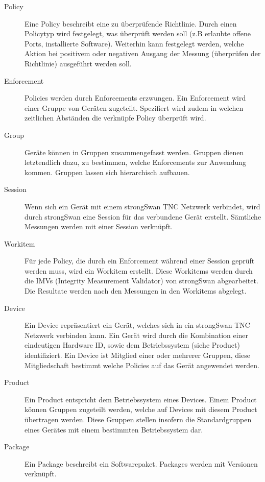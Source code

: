 \begin{description}
	\item[Policy] Eine Policy beschreibt eine zu überprüfende Richtlinie. Durch
	einen Policytyp wird festgelegt, was überprüft werden soll (z.B erlaubte offene
	Ports, installierte Software). Weiterhin kann festgelegt werden, welche Aktion
	bei positivem oder negativen Ausgang der Messung (überprüfen der Richtlinie)
	ausgeführt werden soll.
	
	\item[Enforcement] Policies werden durch Enforcements erzwungen. Ein
	Enforcement wird einer Gruppe von Geräten zugeteilt. Spezifiert wird zudem in
	welchen zeitlichen Abständen die verknüpfe Policy überprüft wird.

	\item[Group] Geräte können in Gruppen zusammengefasst werden. Gruppen dienen
	letztendlich dazu, zu bestimmen, welche Enforcements zur Anwendung kommen.
	Gruppen lassen sich hierarchisch aufbauen.

	\item[Session] Wenn sich ein Gerät mit einem strongSwan TNC Netzwerk verbindet,
	wird durch strongSwan eine Session für das verbundene Gerät erstellt. Sämtliche
	Messungen werden mit einer Session verknüpft.

	\item[Workitem] Für jede Policy, die durch ein Enforcement während einer
	Session geprüft werden muss, wird ein Workitem erstellt. Diese Workitems werden
	durch die IMVs (Integrity Measurement Validator) von strongSwan abgearbeitet.
	Die Resultate werden nach den Messungen in den Workitems abgelegt.

	\item[Device] Ein Device repräsentiert ein Gerät, welches sich in ein
	strongSwan TNC Netzwerk verbinden kann. Ein Gerät wird durch die Kombination
	einer eindeutigen Hardware ID, sowie dem Betriebssystem (siehe Product)
	identifiziert. Ein Device ist Mitglied einer oder mehrerer Gruppen, diese
	Mitgliedschaft bestimmt welche Policies auf das Gerät angewendet werden.

	\item[Product] Ein Product entspricht dem Betriebssystem eines Devices. Einem
	Product können Gruppen zugeteilt werden, welche auf Devices mit
	diesem Product übertragen werden. Diese Gruppen stellen insofern die
	Standardgruppen eines Gerätes mit einem bestimmten Betriebssystem dar.

	\item[Package] Ein Package beschreibt ein Softwarepaket. Packages werden mit
	Versionen verknüpft.


\end{description}
